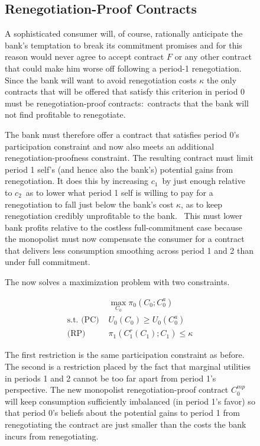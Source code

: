 \documentclass[11pt]{article}%
\begin{document}
\begin{figure}
\subsection{Renegotiation-Proof Contracts}

A sophisticated consumer will, of course, rationally anticipate the bank's temptation to break its commitment promises and for this reason would never   agree to accept contract \(F\)  or any other contract that could make him worse off following  a period-1 renegotiation. Since the bank will want to avoid renegotiation costs $\kappa$ the only contracts that will be offered that satisfy this criterion in period 0 must be renegotiation-proof contracts:\  contracts that the bank will not find profitable to renegotiate.     



The bank must therefore offer a contract that satisfies
period 0's participation constraint and now also meets an additional renegotiation-proofness constraint. The resulting
contract must limit period 1 self's (and hence also the bank's) potential
gains from renegotiation. It does this by increasing $c_{1}$\ by just enough
relative to $c_{2}$\ as to lower what period 1 self is willing to pay for a
renegotiation to fall  just below the bank's cost $\kappa$, as to keep
renegotiation credibly unprofitable to the bank. \ This must lower bank profits relative to the costless full-commitment case because
the monopolist  must now compensate the consumer for a contract that delivers less
consumption smoothing across period 1 and 2 than under full commitment.

    

The now solves a maximization
problem with two constraints. 
 

\begin{align*}
&  \max_{C_{0}}\pi_{0}\left(  C_{0};C_{0}^{a}\right) \\
\text{s.t. (PC) }  &  U_{0}\left(  C_{0}\right)  \geq U_{0}\left(  C_{0}
^{a}\right) \\
\text{(RP) }  &  \pi_{1}\left(  C_{1}^{r}\left(  C_{1}\right)  ;C_{1}\right)
\leq\kappa
\end{align*}


The first restriction is the same participation constraint as before. The
second is a restriction placed by the fact that marginal utilities in periods
1 and 2 cannot be too far apart from period 1's perspective. The new monopolist renegotiation-proof contract $C_{0}^{mp}$ will keep consumption sufficiently
imbalanced (in period 1's favor) so that period 0's beliefs about the
potential gains to period 1 from renegotiating the contract are just smaller
than the costs the bank incurs from renegotiating. 


\end{figure}
\end{document}
